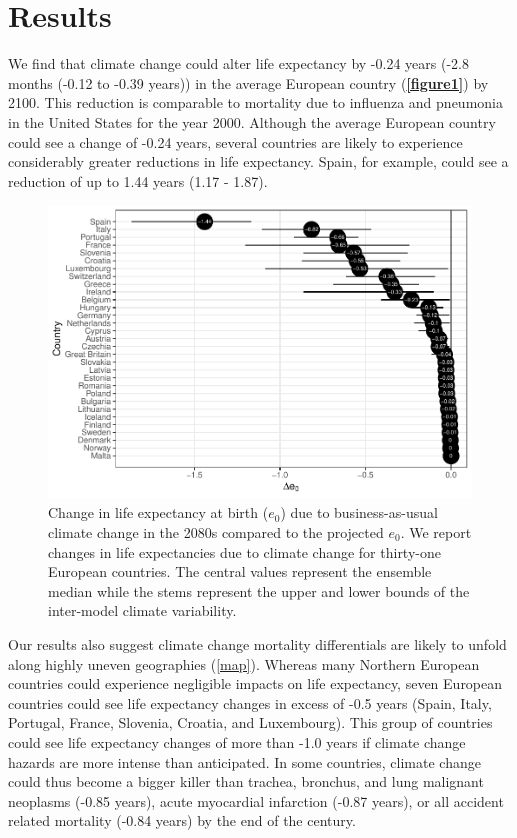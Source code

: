 \documentclass[12pt]{article}
\begin{document}
\section{Results}\label{results}

We find that climate change could alter life expectancy by -0.24 years
(-2.8 months (-0.12 to -0.39 years)) in the average European country
(\textbf{\autoref{figure1}}) by 2100. This reduction is comparable to
mortality due to influenza and pneumonia \citep{arias2013united} in the
United States for the year 2000. Although the average European country
could see a change of -0.24 years, several countries are likely to
experience considerably greater reductions in life expectancy. Spain,
for example, could see a reduction of up to 1.44 years (1.17 - 1.87).

\begin{figure}
\centering
\includegraphics{MANUSCRIPT_files/figure-latex/figure-lollipop-1.pdf}
\caption{Change in life expectancy at birth (\(e_0\)) due to
business-as-usual climate change in the 2080s compared to the projected
\(e_0\). We report changes in life expectancies due to climate change
for thirty-one European countries. The central values represent the
ensemble median while the stems represent the upper and lower bounds of
the inter-model climate variability.\label{figure1}}
\end{figure}

Our results also suggest climate change mortality differentials are
likely to unfold along highly uneven geographies (\autoref{map}).
Whereas many Northern European countries could experience negligible
impacts on life expectancy, seven European countries could see life
expectancy changes in excess of -0.5 years (Spain, Italy, Portugal,
France, Slovenia, Croatia, and Luxembourg). This group of countries
could see life expectancy changes of more than -1.0 years if climate
change hazards are more intense than anticipated. In some countries,
climate change could thus become a bigger killer than trachea, bronchus,
and lung malignant neoplasms (-0.85 years), acute myocardial infarction
(-0.87 years), or all accident related mortality (-0.84 years)
\citep{arias2013united} by the end of the century.
\end{document}
